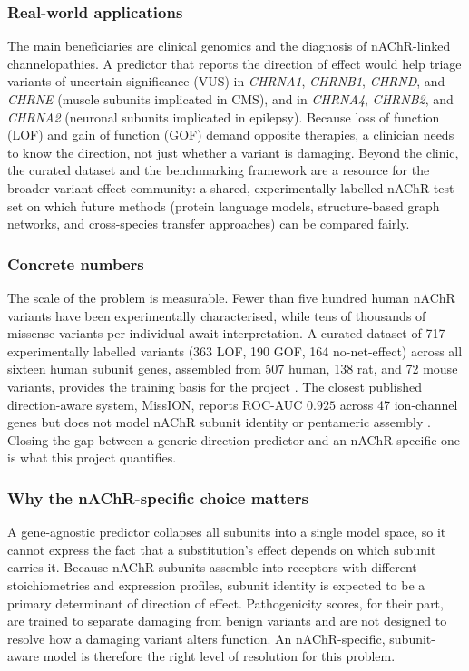\documentclass[rnd]{mas_proposal}
\begin{document}
\subsubsection{Real-world applications}
The main beneficiaries are clinical genomics and the diagnosis of
nAChR-linked channelopathies. A predictor that reports the direction of
effect would help triage variants of uncertain significance (VUS) in
\emph{CHRNA1}, \emph{CHRNB1}, \emph{CHRND}, and \emph{CHRNE} (muscle
subunits implicated in CMS), and in \emph{CHRNA4}, \emph{CHRNB2}, and
\emph{CHRNA2} (neuronal subunits implicated in epilepsy). Because loss of
function (LOF) and gain of function (GOF) demand opposite therapies, a
clinician needs to know the direction, not just whether a variant is
damaging. Beyond the clinic, the curated dataset and the benchmarking
framework are a resource for the broader variant-effect community: a shared,
experimentally labelled nAChR test set on which future methods (protein
language models, structure-based graph networks, and cross-species transfer
approaches) can be compared fairly.

\subsubsection{Concrete numbers}
The scale of the problem is measurable. Fewer than five hundred human nAChR
variants have been experimentally characterised, while tens of thousands of
missense variants per individual await interpretation. A curated dataset of
717 experimentally labelled variants (363 LOF, 190 GOF, 164 no-net-effect)
across all sixteen human subunit genes, assembled from 507 human, 138 rat, and
72 mouse variants, provides the training basis for the project
\cite{mohanraj2026}. The closest published direction-aware system, MissION,
reports ROC-AUC $0.925$ across 47 ion-channel genes but does not model nAChR
subunit identity or pentameric assembly \cite{mission}. Closing the gap between
a generic direction predictor and an nAChR-specific one is what this project
quantifies.

\subsubsection{Why the nAChR-specific choice matters}
A gene-agnostic predictor collapses all subunits into a single model space, so
it cannot express the fact that a substitution's effect depends on which
subunit carries it. Because nAChR subunits assemble into receptors with
different stoichiometries and expression profiles, subunit identity is expected
to be a primary determinant of direction of effect. Pathogenicity scores, for
their part, are trained to separate damaging from benign variants and are not
designed to resolve how a damaging variant alters function. An nAChR-specific,
subunit-aware model is therefore the right level of resolution for this
problem.
\end{document}
